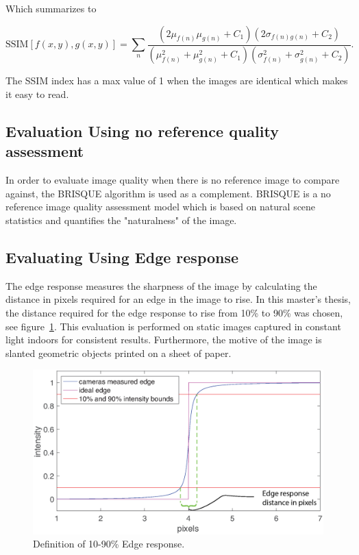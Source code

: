 Which summarizes to

\begin{equation}
\text{SSIM}[f(x,y),g(x,y)] = \sum_n \frac{(2\mu_{f(n)}\mu_{g(n)} + C_1)(2\sigma_{f(n)g(n)} + C_2)}{(\mu_{f(n)}^2 + \mu_{g(n)}^2 + C_1)(\sigma_{f(n)}^2 + \sigma_{g(n)}^2 + C_2)}.
\end{equation} 

The SSIM index has a max value of 1 when the images are identical which makes it easy to read. \cite{book:image_processing}

\subsection{Evaluation Using no reference quality assessment}
In order to evaluate image quality when there is no reference image to compare against, the BRISQUE algorithm is used as a complement. BRISQUE is a no reference image quality assessment model which is based on natural scene statistics and quantifies the "naturalness" of the image.    \cite{article:brisque}

\subsection{Evaluating Using Edge response}
\label{sec:edge_res_def_method}
The edge response measures the sharpness of the image by calculating the distance in pixels required for an edge in the image to rise. In this master's thesis, the distance required for the edge response to rise from 10\% to 90\% was chosen, see figure~\ref{fig:edge_response_def}. This evaluation is performed on static images captured in constant light indoors for consistent results. Furthermore, the motive of the image is slanted geometric objects printed on a sheet of paper.\cite{article:FOI_pres_sens}
 
\begin{figure}[H]
\includegraphics[width = 1\textwidth]{./result/edge_response.eps}
	\caption{Definition of 10-90\% Edge response.}
	\label{fig:edge_response_def}
\end{figure}





